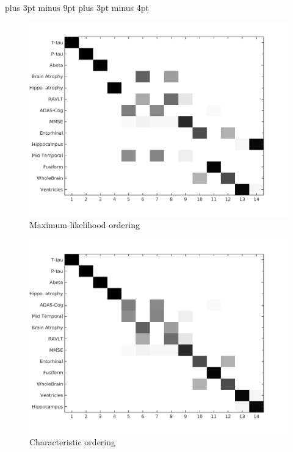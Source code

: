 \documentclass[11pt,a4paper,oneside]{report}
\begin{document}
\belowdisplayskip=12pt plus 3pt minus 9pt
\belowdisplayshortskip=7pt plus 3pt minus 4pt






\begin{figure}[H]
\centering
\includegraphics[scale=0.75]{alex_mat_max_like.png}
\caption{Maximum likelihood ordering}
\end{figure}

\begin{figure}[H]
\centering
\includegraphics[scale=0.75]{alex_mat_char_seq.png}
\caption{Characteristic ordering}
\end{figure}
\end{document}
